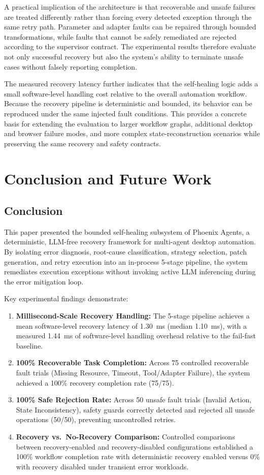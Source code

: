\documentclass[conference]{IEEEtran}
\begin{document}
A practical implication of the architecture is that recoverable and unsafe failures are treated differently rather than forcing every detected exception through the same retry path. Parameter and adapter faults can be repaired through bounded transformations, while faults that cannot be safely remediated are rejected according to the supervisor contract. The experimental results therefore evaluate not only successful recovery but also the system's ability to terminate unsafe cases without falsely reporting completion.

The measured recovery latency further indicates that the self-healing logic adds a small software-level handling cost relative to the overall automation workflow. Because the recovery pipeline is deterministic and bounded, its behavior can be reproduced under the same injected fault conditions. This provides a concrete basis for extending the evaluation to larger workflow graphs, additional desktop and browser failure modes, and more complex state-reconstruction scenarios while preserving the same recovery and safety contracts.

\section{Conclusion and Future Work}

\subsection{Conclusion}
This paper presented the bounded self-healing subsystem of Phoenix Agents, a deterministic, LLM-free recovery framework for multi-agent desktop automation. By isolating error diagnosis, root-cause classification, strategy selection, patch generation, and retry execution into an in-process 5-stage pipeline, the system remediates execution exceptions without invoking active LLM inferencing during the error mitigation loop.

Key experimental findings demonstrate:
\begin{enumerate}
    \item \textbf{Millisecond-Scale Recovery Handling:} The 5-stage pipeline achieves a mean software-level recovery latency of 1.30~ms (median 1.10~ms), with a measured 1.44~ms of software-level handling overhead relative to the fail-fast baseline.
    \item \textbf{100\% Recoverable Task Completion:} Across 75 controlled recoverable fault trials (Missing Resource, Timeout, Tool/Adapter Failure), the system achieved a 100\% recovery completion rate (75/75).
    \item \textbf{100\% Safe Rejection Rate:} Across 50 unsafe fault trials (Invalid Action, State Inconsistency), safety guards correctly detected and rejected all unsafe operations (50/50), preventing uncontrolled retries.
    \item \textbf{Recovery vs.\ No-Recovery Comparison:} Controlled comparisons between recovery-enabled and recovery-disabled configurations established a 100\% workflow completion rate with deterministic recovery enabled versus 0\% with recovery disabled under transient error workloads.
\end{enumerate}
\end{document}
